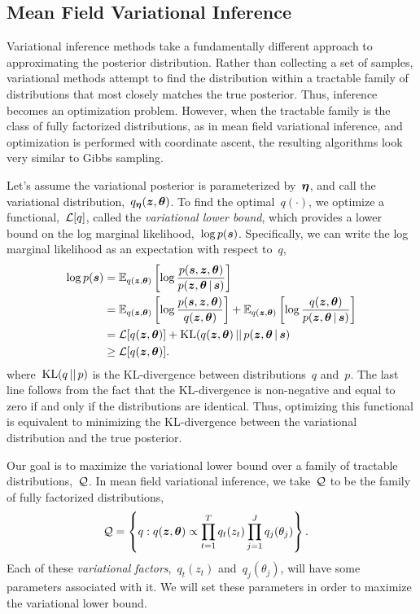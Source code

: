 \subsection{Mean Field Variational Inference}
Variational inference methods take a fundamentally different approach 
to approximating the posterior distribution. Rather than collecting a 
set of samples, variational methods attempt to find the distribution 
within a tractable family of distributions that most closely matches 
the true posterior. Thus, inference becomes an optimization problem. 
However, when the tractable family is the class of fully factorized 
distributions, as in mean field variational inference, and optimization
is performed with coordinate ascent, the resulting algorithms look 
very similar to Gibbs sampling.

Let's assume the variational posterior is parameterized by~$\boldsymbol{\eta}$,
and call the variational distribution,~$q_{\boldsymbol{\eta}}(\boldsymbol{z}, \boldsymbol{\theta})$.
To find the optimal~$q(\cdot)$, we optimize a functional,~$\mathcal{L}[q]$,
called the \emph{variational lower bound}, which
provides a lower bound on the log marginal likelihood,~${\log p(\boldsymbol{s})}$.
Specifically, we can write the log marginal likelihood as an 
expectation with respect to~$q$,
\begin{align}
  \log p(\boldsymbol{s}) 
  &= \mathbb{E}_{q(\boldsymbol{z}, \boldsymbol{\theta})} \left[ \log \frac{p(\boldsymbol{s}, \boldsymbol{z}, \boldsymbol{\theta})}{p(\boldsymbol{z}, \boldsymbol{\theta} \,|\, \boldsymbol{s})} \right] \\
  &= \mathbb{E}_{q(\boldsymbol{z}, \boldsymbol{\theta})} \left[ \log \frac{p(\boldsymbol{s}, \boldsymbol{z}, \boldsymbol{\theta})}{q(\boldsymbol{z}, \boldsymbol{\theta})} \right]
   + \mathbb{E}_{q(\boldsymbol{z}, \boldsymbol{\theta})} \left[ \log \frac{q(\boldsymbol{z}, \boldsymbol{\theta})}{p(\boldsymbol{z}, \boldsymbol{\theta} \,|\, \boldsymbol{s})} \right] \\
  &= \mathcal{L}[q(\boldsymbol{z}, \boldsymbol{\theta})] + \mathrm{KL}(q(\boldsymbol{z}, \boldsymbol{\theta}) {\,||\,} p(\boldsymbol{z}, \boldsymbol{\theta} \,|\, \boldsymbol{s}) \\
  &\geq \mathcal{L}[q(\boldsymbol{z}, \boldsymbol{\theta})].
\end{align}
where~$\mathrm{KL}(q {\,||\,} p)$ is the KL-divergence between distributions~$q$ and~$p$. 
The last line follows from the fact that the KL-divergence is non-negative
and equal to zero if and only if the distributions are identical. Thus, 
optimizing this functional is equivalent to minimizing the KL-divergence
between the variational distribution and the true posterior.

Our goal is to maximize the variational lower bound over a family of 
tractable distributions,~$\mathcal{Q}$. In mean field variational inference, 
we take~$\mathcal{Q}$ to be the family of fully factorized distributions,
\begin{align}
  \mathcal{Q} &= \left \{ q: q(\boldsymbol{z}, \boldsymbol{\theta}) \propto \prod_{t=1}^T q_t(z_t) \prod_{j=1}^J q_j(\theta_j) \right\}.
\end{align}
Each of these \emph{variational factors},~$q_t(z_t)$ and~$q_j(\theta_j)$, will have 
some parameters associated with it. We will set these parameters in order to 
maximize the variational lower bound.

